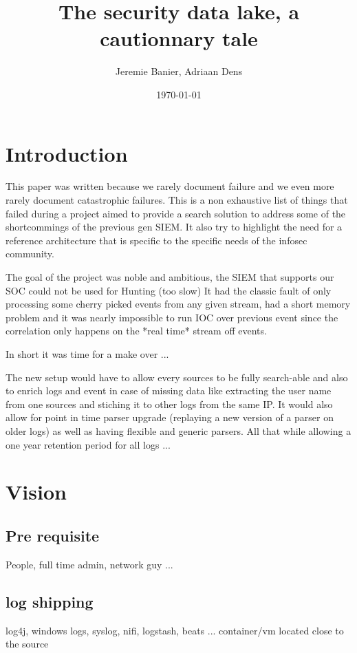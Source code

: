 \documentclass[a4paper,12pt]{article}
\begin{document}
\title{The security data lake, a cautionnary tale}
\author{Jeremie Banier, Adriaan Dens}
\date{\today}
\maketitle
\newpage
\tableofcontents
\newpage
\section{Introduction}
This paper was written because we rarely document failure and we even more rarely document 
catastrophic failures. This is a non exhaustive list of things that failed during a project aimed 
to provide a search solution to address some of the shortcommings of the previous gen SIEM.
It also try to highlight the need for a reference architecture that is specific to the specific needs of the infosec community.

The goal of the project was noble and ambitious, the SIEM that supports our SOC could not be used for Hunting (too slow) 
It had the classic fault of only processing some cherry picked events from any given stream, had a short memory problem and it was nearly impossible 
to run IOC over previous event since the correlation only happens on the *real time* stream off events.

In short it was time for a make over ... 

The new setup would have to allow every sources to be fully search-able and also to enrich logs and event in case of missing data
like extracting the user name from one sources and stiching it to other logs from the same IP.
It would also allow for point in time parser upgrade (replaying a new  version of a parser on older logs) as well as having flexible and 
generic parsers. All that while allowing a one year retention period for all logs ...
\newpage
\section{Vision}
\subsection{Pre requisite}
People, full time admin, network guy ...
\subsection{log shipping}
log4j, windows logs, syslog, nifi, logstash, beats ...
container/vm located close to the source
\end{document}
